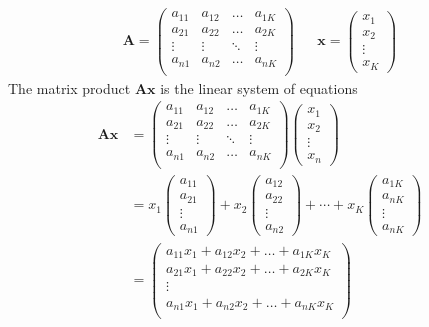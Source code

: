 \documentclass[
]{book}
\theoremstyle{definition}
\theoremstyle{definition}
\theoremstyle{definition}
\theoremstyle{remark}
\begin{document}
\[
\begin{aligned}
\mathbf{A} = \begin{pmatrix}
a_{11} & a_{12} & \ldots & a_{1K} \\
a_{21} & a_{22} & \ldots & a_{2K} \\
\vdots & \vdots & \ddots & \vdots \\
a_{n1} & a_{n2} & \ldots & a_{nK} \\
\end{pmatrix} && \mathbf{x} = \begin{pmatrix} x_1 \\ x_2 \\ \vdots \\ x_K \end{pmatrix}
\end{aligned}
\]
The matrix product \(\mathbf{A}\mathbf{x}\) is the linear system of equations
\[
\begin{aligned}
\mathbf{A}  \mathbf{x} & = \begin{pmatrix}
a_{11} & a_{12} & \ldots & a_{1K} \\
a_{21} & a_{22} & \ldots & a_{2K} \\
\vdots & \vdots & \ddots & \vdots \\
a_{n1} & a_{n2} & \ldots & a_{nK} \\
\end{pmatrix} \begin{pmatrix} x_1 \\ x_2 \\ \vdots \\ x_n \end{pmatrix} \\
& = x_1\begin{pmatrix}
a_{11} \\ a_{21} \\ \vdots \\ a_{n1} 
\end{pmatrix} +
x_2 \begin{pmatrix}
a_{12} \\ a_{22} \\ \vdots \\ a_{n2} 
\end{pmatrix} +
\cdots + x_K \begin{pmatrix}
a_{1K} \\ a_{nK} \\ \vdots \\ a_{nK} \end{pmatrix} \\
& =  \begin{pmatrix}
a_{11} x_1 + a_{12} x_2 + \ldots + a_{1K} x_K \\
a_{21} x_1 + a_{22} x_2 + \ldots + a_{2K} x_K \\
\vdots \\
a_{n1} x_1 + a_{n2} x_2 + \ldots + a_{nK} x_K \\
\end{pmatrix}
\end{aligned}
\]
\end{document}
